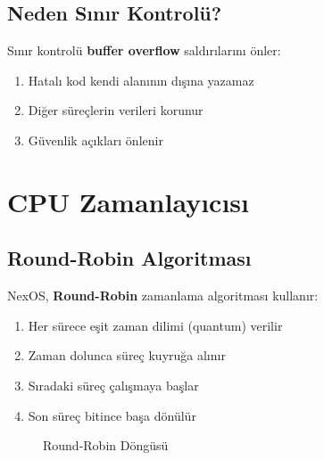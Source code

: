 \documentclass[12pt,a4paper]{report}
\begin{document}
\section{Neden Sınır Kontrolü?}

Sınır kontrolü \textbf{buffer overflow} saldırılarını önler:

\begin{enumerate}
    \item Hatalı kod kendi alanının dışına yazamaz
    \item Diğer süreçlerin verileri korunur
    \item Güvenlik açıkları önlenir
\end{enumerate}

\chapter{CPU Zamanlayıcısı}

\section{Round-Robin Algoritması}

NexOS, \textbf{Round-Robin} zamanlama algoritması kullanır:

\begin{enumerate}
    \item Her sürece eşit zaman dilimi (quantum) verilir
    \item Zaman dolunca süreç kuyruğa alınır
    \item Sıradaki süreç çalışmaya başlar
    \item Son süreç bitince başa dönülür
\end{enumerate}

\begin{figure}[h]
\centering
{}
\caption{Round-Robin Döngüsü}
\end{figure}
\end{document}
